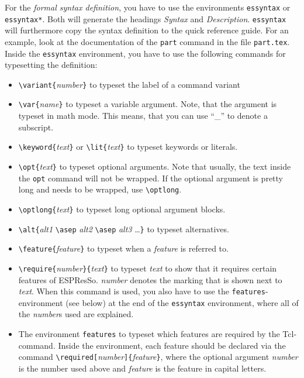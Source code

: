 \documentclass[
a4paper,                        %
11pt,                           %
twoside,                        %
footsepline,                    %
headsepline,                    %
headexclude,                    %
footexclude,                    %
pagesize,                       %
bibtotocnumbered,               %
idxtotoc                        %
]{scrartcl}
\newcommand{\es}{\mbox{\textsf{ESPResSo}}\xspace}
\begin{document}
For the \emph{formal syntax definition}, you have to use the
environments \texttt{essyntax} or \texttt{essyntax*}.  Both will
generate the headings \emph{Syntax} and
\emph{Description}. \texttt{essyntax} will furthermore copy the syntax
definition to the quick reference guide.  For an example, look at the
documentation of the \texttt{part} command in the file
\texttt{part.tex}. Inside the \texttt{essyntax} environment, you have
to use the following commands for typesetting the definition:
\begin{itemize}
\item \verb!\variant{!\textit{number}\verb!}! to typeset the label of a
  command variant
\item \verb!\var{!\textit{name}\verb!}! to typeset a variable
  argument. Note, that the argument is typeset in math mode.  This
  means, that you can use ``\_'' to denote a subscript.
\item \verb!\keyword{!\textit{text}\verb!}! or
  \verb!\lit{!\textit{text}\verb!}! to typeset keywords or literals.
\item \verb!\opt{!\textit{text}\verb!}! to typeset optional
  arguments. Note that usually, the text inside the \texttt{opt}
  command will not be wrapped. If the optional argument is pretty long
  and needs to be wrapped, use \verb!\optlong!.
\item \verb!\optlong{!\textit{text}\verb!}! to typeset long optional
  argument blocks.
\item \verb!\alt{!\textit{alt1} \verb!\asep! \textit{alt2}
    \verb!\asep! \textit{alt3} \dots \verb!}! to typeset alternatives.
\item \verb!\feature{!\textit{feature}\verb!}! to typeset when a
  \textit{feature} is referred to.
\item \verb!\require{!\textit{number}\verb!}{!\textit{text}\verb!}! to
  typeset \textit{text} to show that it requires certain features of
  \es. \textit{number} denotes the marking that is shown next to
  \textit{text}. When this command is used, you also have to use the
  \texttt{features}-environment (see below) at the end of the
  \texttt{essyntax} environment, where all of the \textit{number}s
  used are explained.
\item The environment \texttt{features} to typeset which features are
  required by the Tcl-command. Inside the environment, each feature
  should be declared via the command
  \verb!\required[!\textit{number}\verb!]{!\textit{feature}\verb!}!,
  where the optional argument \textit{number} is the number used above
  and \textit{feature} is the feature in capital letters.
\end{itemize}
\end{document}

